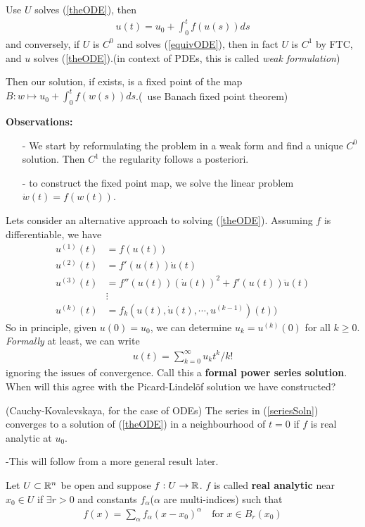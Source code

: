 \documentclass[10pt,a4paper]{report}
\begin{document}
\pf Use $U$ solves (\ref{theODE}), then 
\begin{align}
u(t) = u_0 + \int_0^t f(u(s))ds \label{equivODE}
\end{align}
and conversely, if $U$ is $C^0$ and solves (\ref{equivODE}), then in fact $U$ is $C^1$ by FTC, and $u$ solves (\ref{theODE}).(in context of PDEs, this is called \emph{weak formulation})

Then our solution, if exists, is a fixed point of the map $B : w \mapsto u_0 + \int_0^t f(w(s))ds$.(~use Banach fixed point theorem)
\s

\textbf{Observations:}
\begin{itemize}
\item[-] We start by reformulating the problem in a weak form and find a unique $C^0$ solution. Then $C^1$ the regularity follows a posteriori.
\item[-] to construct the fixed point map, we solve the linear problem $\dot{w}(t) = f(w(t))$.
\end{itemize}
\s

Lets consider an alternative approach to solving (\ref{theODE}). Assuming $f$ is differentiable, we have
\begin{align*}
u^{(1)}(t) &= f(u(t)) \\
u^{(2)}(t) &= f'(u(t))\dot{u}(t) \\
u^{(3)}(t) &= f''(u(t))(\dot{u}(t))^2 + f'(u(t))\ddot{u}(t) \\
&\vdots \\
u^{(k)}(t) &= f_k(u(t), \dot{u}(t),\cdots, u^{(k-1)})(t))
\end{align*}
So in principle, given $u(0) = u_0$, we can determine $u_k = u^{(k)}(0)$ for all $k \geq 0$. \emph{Formally} at least, we can write
\begin{align}
u(t) = \sum_{k=0}^{\infty} u_k t^k / k! \label{seriesSoln}
\end{align}
ignoring the issues of convergence. Call this a \textbf{formal power series solution}. When will this agree with the Picard-Lindel\"{o}f solution we have constructed?
\s

\thm(Cauchy-Kovalevskaya, for the case of ODEs) The series in (\ref{seriesSoln}) converges to a solution of (\ref{theODE}) in a neighbourhood of $t=0$ if $f$ is real analytic at $u_0$.

-This will follow from a more general result later.
\s

 Let $U \subset \mathbb{R}^n$ be open and suppose $f: U \rightarrow \mathbb{R}$. $f$ is called \textbf{real analytic} near $x_0 \in U$ if $\exists r >0$ and constants $f_{\alpha}$($\alpha$ are multi-indices) such that
\begin{align*}
f(x) = \sum_{\alpha}f_{\alpha} (x-x_0)^{\alpha} \quad \text{for } x \in B_r(x_0)
\end{align*}
\s
\end{document}
